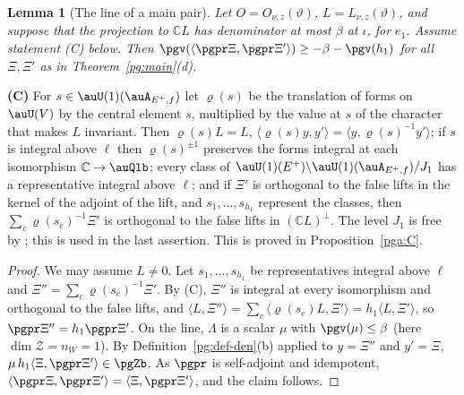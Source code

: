 \documentclass[10pt]{amsart}
\newtheorem{lemma}[theorem]{Lemma}
\theoremstyle{definition}
\theoremstyle{remark}
\newcommand{\C}{\mathbb C}
\begin{document}
\begin{lemma}[The line of a main pair]\label{pg:line}
Let $O=O_{\nu,z}(\vartheta)$, $L=L_{\nu,z}(\vartheta)$, and suppose that the projection to $\C L$
has denominator at most $\beta$ at $\iota$, for $e_1$. Assume statement \emph{(C)} below. Then
$\pgv(\langle\pgpr\Xi,\pgpr\Xi'\rangle)\ge-\beta-\pgv(h_1)$ for all $\Xi,\Xi'$ as in
Theorem~\ref{pg:main}(d).
\end{lemma}
\smallskip\noindent\textbf{(C)} For $s\in\auU(1)(\auA_{E^+,f})$ let $\varrho(s)$ be the translation of forms on $\auU(V)$ by the
central element $s$, multiplied by the value at $s$ of the character that makes $L$ invariant.
Then $\varrho(s)L=L$, $\langle\varrho(s)y,y'\rangle=\langle y,\varrho(s)^{-1}y'\rangle$; if $s$ is
integral above $\ell$ then $\varrho(s)^{\pm1}$ preserves the forms integral at each isomorphism
$\C\to\auQlb$; every class of $\auU(1)(E^+)\backslash\auU(1)(\auA_{E^+,f})/J_1$ has a
representative integral above $\ell$; and if $\Xi'$ is orthogonal to the false lifts in the kernel
of the adjoint of the lift, and $s_1,\dots,s_{h_1}$ represent the classes, then
$\sum_c\varrho(s_c)^{-1}\Xi'$ is orthogonal to the false lifts in $(\C L)^\perp$. The level $J_1$ is
free by {\cite[Lemma~14.5]{P46}}; this is used in the last assertion. This is proved in Proposition~\ref{pga:C}.\par\smallskip
\begin{proof}
We may assume $L\ne0$. Let $s_1,\dots,s_{h_1}$ be representatives integral above $\ell$ and
$\Xi''=\sum_c\varrho(s_c)^{-1}\Xi'$. By (C), $\Xi''$ is integral at every isomorphism and
orthogonal to the false lifts, and $\langle L,\Xi''\rangle=\sum_c\langle\varrho(s_c)L,\Xi'\rangle
=h_1\langle L,\Xi'\rangle$, so $\pgpr\Xi''=h_1\pgpr\Xi'$. On the line, $\Lambda$ is a scalar
$\mu$ with $\pgv(\mu)\le\beta$ (here $\dim\mathcal Z=n_W=1$). By Definition~\ref{pg:def-den}(b)
applied to $y=\Xi''$ and $y'=\Xi$, $\mu\,h_1\langle\Xi,\pgpr\Xi'\rangle\in\pgZb$. As $\pgpr$ is
self-adjoint and idempotent, $\langle\pgpr\Xi,\pgpr\Xi'\rangle=\langle\Xi,\pgpr\Xi'\rangle$, and
the claim follows.
\end{proof}
\end{document}

